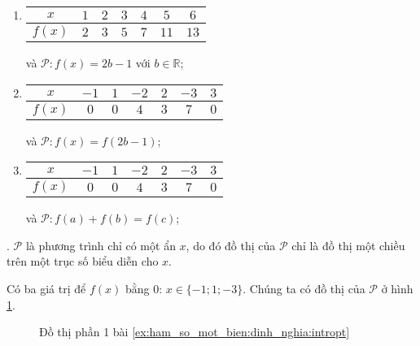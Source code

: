 \begin{enumerate}
   \item
   \begin{tabular}{|c|c|c|c|c|c|c|}
      \hline
      $x$ & $1$ & $2$ & $3$ & $4$ & $5$ & $6$\\
      \hline
      $f(x)$ & $2$ & $3$ & $5$ & $7$ & $11$ & $13$\\
      \hline
   \end{tabular} và $\mathcal{P}: f(x) = 2b-1$ với $b \in \mathbb{R}$;

   \item
   \begin{tabular}{|c|c|c|c|c|c|c|}
      \hline
      $x$ & $-1$ & $1$ & $-2$ & $2$ & $-3$ & $3$\\
      \hline
      $f(x)$ & $0$ & $0$ & $4$ & $3$ & $7$ & $0$\\
      \hline
   \end{tabular} và $\mathcal{P}: f(x) = f(2b - 1)$;

   \item 
   \begin{tabular}{|c|c|c|c|c|c|c|}
      \hline
      $x$ & $-1$ & $1$ & $-2$ & $2$ & $-3$ & $3$\\
      \hline
      $f(x)$ & $0$ & $0$ & $4$ & $3$ & $7$ & $0$\\
      \hline
   \end{tabular} và $\mathcal{P}: f(a) + f(b) = f(c)$;
\end{enumerate}


{
   \begin{minipageindent}{0.48\textwidth}
      \setcounter{subexercise}{1}
      . $\mathcal{P}$ là phương trình chỉ có một ẩn $x$, do đó đồ thị của $\mathcal{P}$ chỉ là đồ thị một chiều trên một trục số biểu diễn cho $x$.

      Có ba giá trị để $f(x)$ bằng $0$: $x\in \{-1; 1; -3\}$. Chúng ta có đồ thị của $\mathcal{P}$ ở hình \ref{fig:ham_so_mot_bien:dinh_nghia:dtp1}.
   \end{minipageindent}
   \hfill
   \begin{minipageindent}{0.48\textwidth}
      \begin{figure}[H]
         \centering
         \caption{Đồ thị phần 1 bài \ref{ex:ham_so_mot_bien:dinh_nghia:intropt}}
         \label{fig:ham_so_mot_bien:dinh_nghia:dtp1}
      \end{figure}
   \end{minipageindent}
}


